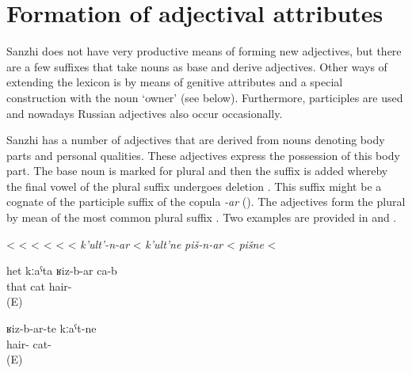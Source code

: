 
\section{Formation of adjectival attributes}
\label{sec:Derivation of adjectives}
Sanzhi does not have very productive means of forming new adjectives, but there are a few suffixes that take nouns as base and derive adjectives. Other ways of extending the lexicon is by means of genitive attributes and a special construction with the noun `owner' (see below). Furthermore, participles are used and nowadays Russian adjectives also occur occasionally.  

Sanzhi has a number of adjectives that are derived from nouns denoting body parts and personal qualities. These adjectives express the possession of this body part. The base noun is marked for plural and then the suffix  is added whereby the final vowel of the plural suffix undergoes deletion . This suffix might be a cognate of the participle suffix of the copula \textit{-ar} (). The adjectives form the plural by mean of the most common plural suffix . Two examples are provided in  and .
%
\begin{exe}
	\ex	\label{ex:adjectivesWithBAR}
	\begin{xlist}
		\TabPositions{16em}
		\ex	{} 					\tab <  
		\ex	{} 					\tab	<  
		\ex	{}  	\tab	<   
		\ex	{}  	\tab	 <   	
		\ex	{}  \tab	 <  
		\ex	{}  \tab	<   
		\ex \textit{k'ult'-n-ar}  \tab	< \textit{k'ult'ne} 
		\ex \textit{piš-n-ar}  \tab	< \textit{pišne} 
		\ex	{} 			\tab	 <  
	\end{xlist}
\end{exe}

\begin{exe}
	\ex
	\begin{xlist}
		\ex	\label{ex:The cat is hairy}
		\gll   	het	kːaˁta	ʁiz-b-ar	ca-b \\
			that	cat	hair-	\tsc{cop-n}\\
		\glt  	\sqt{The cat is hairy.} (E)

		\ex	\label{ex:hairy cats}
		\gll   	ʁiz-b-ar-te kːaˁt-ne \\
			hair-	cat-\tsc{pl} \\
		\glt	\sqt{hairy cats} (E)
	\end{xlist}
\end{exe}

